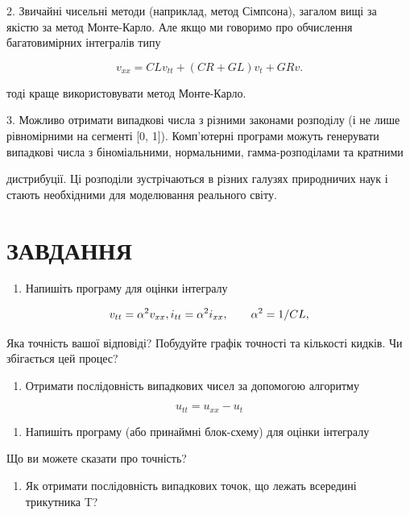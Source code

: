 \documentclass[
  ukrainian,
]{article}
\providecommand{\tightlist}{%
  \setlength{\itemsep}{0pt}\setlength{\parskip}{0pt}}
\begin{document}
2. Звичайні чисельні методи (наприклад, метод Сімпсона), загалом вищі за якістю за метод Монте-Карло. Але якщо ми говоримо про обчислення багатовимірних інтегралів типу

$$
v_{xx} = CLv_{tt} + (CR + GL)v_t + GRv.
$$

тоді краще використовувати метод Монте-Карло.

3. Можливо отримати випадкові числа з різними законами розподілу (і не лише рівномірними на сегменті [0, 1]).
Комп'ютерні програми можуть генерувати випадкові числа з біноміальними,
нормальними, гамма-розподілами та кратними

дистрибуції. Ці розподіли зустрічаються в різних галузях природничих
наук і стають необхідними для моделювання реального світу.

\section{ЗАВДАННЯ}\label{ux437ux430ux432ux434ux430ux43dux43dux44f-11}

\begin{enumerate}
\def\labelenumi{\arabic{enumi}.}
\tightlist
\item
  Напишіть програму для оцінки інтегралу
\end{enumerate}

\[
v_{tt} = \alpha^2 v_{xx}, \\ i_{tt} = \alpha^2 i_{xx}, \qquad \alpha^2 = 1/CL,
\]

Яка точність вашої відповіді? Побудуйте графік точності та кількості
кидків. Чи збігається цей процес?

\begin{enumerate}
\def\labelenumi{\arabic{enumi}.}
\setcounter{enumi}{1}
\tightlist
\item
  Отримати послідовність випадкових чисел за допомогою алгоритму
\end{enumerate}

\[
u_{tt} = u_{xx} - u_t
\]

\begin{enumerate}
\def\labelenumi{\arabic{enumi}.}
\setcounter{enumi}{2}
\tightlist
\item
  Напишіть програму (або принаймні блок-схему) для оцінки інтегралу
\end{enumerate}

Що ви можете сказати про точність?

\begin{enumerate}
\def\labelenumi{\arabic{enumi}.}
\setcounter{enumi}{3}
\tightlist
\item
  Як отримати послідовність випадкових точок, що лежать всередині
  трикутника T?
\end{enumerate}
\end{document}
